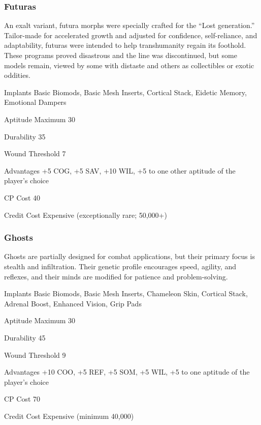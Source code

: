 \subsubsection{Futuras}
\label{sec:starting-futuras}

An exalt variant, futura morphs were specially crafted for the “Lost generation.” Tailor-made for accelerated growth and adjusted for confidence, self-reliance, and adaptability, futuras were intended to help transhumanity regain its foothold. These programs proved disastrous and the line was discontinued, but some models remain, viewed by some with distaste and others as collectibles or exotic oddities.

\begin{description*}
\item[Implants] Basic Biomods, Basic Mesh Inserts, Cortical Stack, Eidetic Memory, Emotional Dampers
\item[Aptitude Maximum] 30 
\item[Durability] 35 
\item[Wound Threshold] 7 
\item[Advantages] +5 COG, +5 SAV, +10 WIL, +5 to one other aptitude of the player’s choice
\item[CP Cost] 40 
\item[Credit Cost] Expensive (exceptionally rare; 50,000+) 
\end{description*}

\subsubsection{Ghosts}
\label{sec:starting-ghosts}

Ghosts are partially designed for combat applications, but their primary focus is stealth and infiltration. Their genetic profile encourages speed, agility, and reflexes, and their minds are modified for patience and problem-solving.

\begin{description*}
\item[Implants] Basic Biomods, Basic Mesh Inserts, Chameleon Skin, Cortical Stack, Adrenal Boost, Enhanced Vision, Grip Pads
\item[Aptitude Maximum] 30 
\item[Durability] 45 
\item[Wound Threshold] 9 
\item[Advantages] +10 COO, +5 REF, +5 SOM, +5 WIL, +5 to one aptitude of the player’s choice
\item[CP Cost] 70 
\item[Credit Cost] Expensive (minimum 40,000) 
\end{description*}

